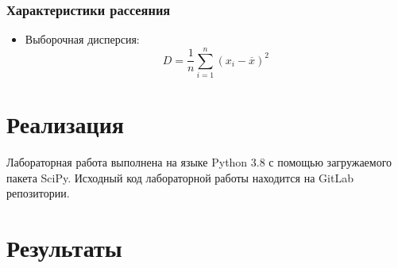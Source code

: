 \documentclass[12pt,a4paper]{article}
\begin{document}
			\subsubsection{Характеристики рассеяния}
				\begin{itemize}
					\item Выборочная дисперсия:
					\begin{equation}
						D=\frac{1}{n}\sum_{i=1}^{n}(x_i-\overline{x})^2
					\end{equation}
				\end{itemize}
	\newpage
	
	\section{Реализация}
	Лабораторная работа выполнена на языке Python 3.8 с помощью загружаемого пакета SciPy. Исходный код лабораторной работы находится на GitLab репозитории.
	\newpage
	
	\section{Результаты}
\end{document}
